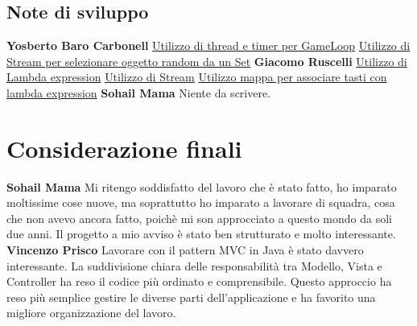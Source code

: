\documentclass[a4paper,12pt]{report}
\begin{document}
\section{Note di sviluppo}
\textbf{Yosberto Baro Carbonell}\newline
\href{https://github.com/Carbocode/OOP23-Breakout/blob/5098fbc11d7a6030a018341082738afb8926974c/src/main/java/it/unibo/controller/GameLoop.java\#L148}{Utilizzo di thread e timer per GameLoop}\newline
\newline
\href{https://github.com/Carbocode/OOP23-Breakout/blob/5098fbc11d7a6030a018341082738afb8926974c/src/test/java/it/unibo/api/CollisionManagerTest.java\#L89}{Utilizzo di Stream per selezionare oggetto random da un Set}\newline
\textbf{Giacomo Ruscelli}\newline
\newline
\href{https://github.com/Carbocode/OOP23-Breakout/blob/69327514cd4e3f224d6867c94b9345083c8b08f5/src/main/java/it/unibo/model/Bar.java\#L130}{Utilizzo di Lambda expression}\newline
\href{https://github.com/Carbocode/OOP23-Breakout/blob/69327514cd4e3f224d6867c94b9345083c8b08f5/src/main/java/it/unibo/model/ScoreboardImpl.java\#L98}{Utilizzo di Stream}\newline
\href{https://github.com/Carbocode/OOP23-Breakout/blob/69327514cd4e3f224d6867c94b9345083c8b08f5/src/main/java/it/unibo/model/Bar.java\#L36}{Utilizzo mappa per associare tasti con lambda expression}
\newline
\textbf{Sohail Mama}\newline
Niente da scrivere.

\chapter{Considerazione finali}
\textbf{Sohail Mama}\newline
Mi ritengo soddisfatto del lavoro che è stato fatto, ho imparato moltissime cose nuove, ma soprattutto ho imparato a lavorare di squadra, cosa che non avevo ancora fatto, poichè mi son approcciato a questo mondo da soli due anni.\newline
Il progetto a mio avviso è stato ben strutturato e molto interessante.\newline\newline
\textbf{Vincenzo Prisco}\newline
Lavorare con il pattern MVC in Java è stato davvero interessante. La suddivisione chiara delle responsabilità tra Modello, Vista e Controller ha reso il codice più ordinato e comprensibile. Questo approccio ha reso più semplice gestire le diverse parti dell'applicazione e ha favorito una migliore organizzazione del lavoro.\newline
\end{document}

